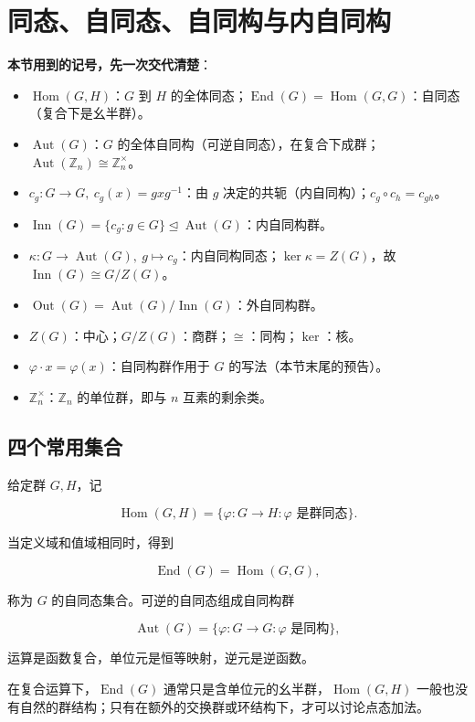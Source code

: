 \section{同态、自同态、自同构与内自同构}


\textbf{本节用到的记号，先一次交代清楚}：

\begin{itemize}
\item $\operatorname{Hom}(G,H)$：$G$ 到 $H$ 的全体同态；$\operatorname{End}(G)=\operatorname{Hom}(G,G)$：自同态（复合下是幺半群）。
\item $\operatorname{Aut}(G)$：$G$ 的全体自同构（可逆自同态），在复合下成群；$\operatorname{Aut}(\mathbb Z_n)\cong\mathbb Z_n^\times$。
\item $c_g:G\to G,\ c_g(x)=gxg^{-1}$：由 $g$ 决定的共轭（内自同构）；$c_g\circ c_h=c_{gh}$。
\item $\operatorname{Inn}(G)=\{c_g:g\in G\}\trianglelefteq\operatorname{Aut}(G)$：内自同构群。
\item $\kappa:G\to\operatorname{Aut}(G),\ g\mapsto c_g$：内自同构同态；$\ker\kappa=Z(G)$，故 $\operatorname{Inn}(G)\cong G/Z(G)$。
\item $\operatorname{Out}(G)=\operatorname{Aut}(G)/\operatorname{Inn}(G)$：外自同构群。
\item $Z(G)$：中心；$G/Z(G)$：商群；$\cong$：同构；$\ker$：核。
\item $\varphi\cdot x=\varphi(x)$：自同构群作用于 $G$ 的写法（本节末尾的预告）。
\item $\mathbb Z_n^\times$：$\mathbb Z_n$ 的单位群，即与 $n$ 互素的剩余类。
\end{itemize}


\subsection{四个常用集合}


给定群 $G,H$，记

\[
\operatorname{Hom}(G,H)=\{\varphi:G\to H:\varphi\text{ 是群同态}\}.
\]

当定义域和值域相同时，得到

\[
\operatorname{End}(G)=\operatorname{Hom}(G,G),
\]

称为 $G$ 的自同态集合。可逆的自同态组成自同构群

\[
\operatorname{Aut}(G)=\{\varphi:G\to G:\varphi\text{ 是同构}\},
\]

运算是函数复合，单位元是恒等映射，逆元是逆函数。

在复合运算下，$\operatorname{End}(G)$ 通常只是含单位元的幺半群，$\operatorname{Hom}(G,H)$ 一般也没有自然的群结构；只有在额外的交换群或环结构下，才可以讨论点态加法。

